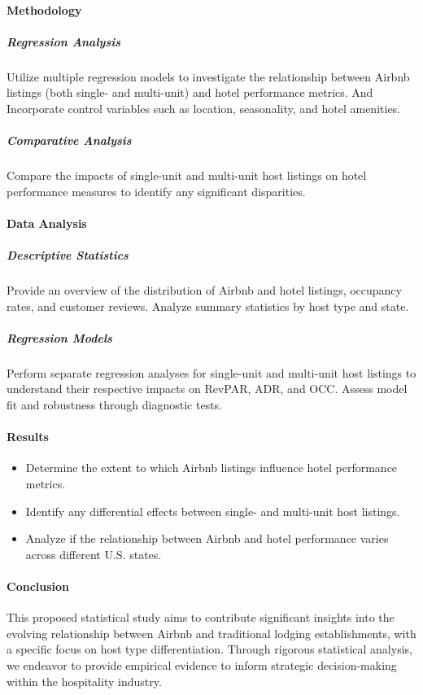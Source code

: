 \documentclass[12pt]{article}
\begin{document}
\paragraph{Methodology}

\subparagraph{Regression Analysis}
Utilize multiple regression models to investigate the relationship between Airbnb listings (both single- and multi-unit) and hotel performance metrics. And Incorporate control variables such as location, seasonality, and hotel amenities.

\subparagraph {Comparative Analysis}
Compare the impacts of single-unit and multi-unit host listings on hotel performance measures to identify any significant disparities.

\paragraph {Data Analysis}

\subparagraph{Descriptive Statistics}

Provide an overview of the distribution of Airbnb and hotel listings, occupancy rates, and customer reviews.
Analyze summary statistics by host type and state.

\subparagraph{Regression Models}

Perform separate regression analyses for single-unit and multi-unit host listings to understand their respective impacts on RevPAR, ADR, and OCC.
Assess model fit and robustness through diagnostic tests.


\paragraph{Results}

\begin{itemize}

\item Determine the extent to which Airbnb listings influence hotel performance metrics.
\item Identify any differential effects between single- and multi-unit host listings.
\item Analyze if the relationship between Airbnb and hotel performance varies across different U.S. states.

\end{itemize}

\paragraph{Conclusion}

This proposed statistical study aims to contribute significant insights into the evolving relationship between Airbnb and traditional lodging establishments, with a specific focus on host type differentiation. Through rigorous statistical analysis, we endeavor to provide empirical evidence to inform strategic decision-making within the hospitality industry.



\end{document}
